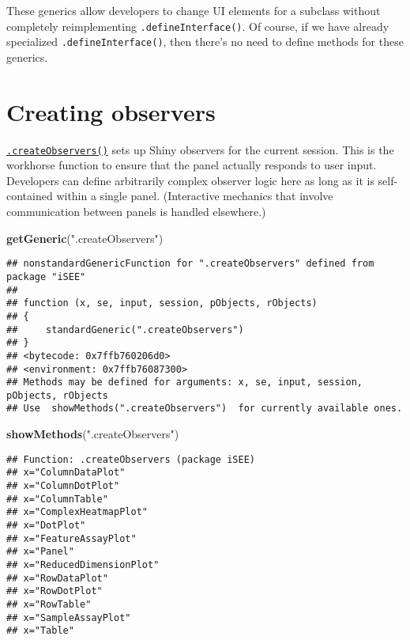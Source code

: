 \documentclass[
]{book}
\newenvironment{Shaded}{\begin{snugshade}}{\end{snugshade}}
\newcommand{\KeywordTok}[1]{\textcolor[rgb]{0.13,0.29,0.53}{\textbf{#1}}}
\newcommand{\NormalTok}[1]{#1}
\newcommand{\StringTok}[1]{\textcolor[rgb]{0.31,0.60,0.02}{#1}}
\begin{document}
These generics allow developers to change UI elements for a subclass without completely reimplementing \texttt{.defineInterface()}.
Of course, if we have already specialized \texttt{.defineInterface()}, then there's no need to define methods for these generics.

\hypertarget{creating-observers}{%
\section{Creating observers}\label{creating-observers}}

\href{https://isee.github.io/iSEE/reference/observer-generics.html}{\texttt{.createObservers()}} sets up Shiny observers for the current session.
This is the workhorse function to ensure that the panel actually responds to user input.
Developers can define arbitrarily complex observer logic here as long as it is self-contained within a single panel.
(Interactive mechanics that involve communication between panels is handled elsewhere.)

\begin{Shaded}
\begin{Highlighting}[]
\KeywordTok{getGeneric}\NormalTok{(}\StringTok{".createObservers"}\NormalTok{)}
\end{Highlighting}
\end{Shaded}

\begin{verbatim}
## nonstandardGenericFunction for ".createObservers" defined from package "iSEE"
## 
## function (x, se, input, session, pObjects, rObjects) 
## {
##     standardGeneric(".createObservers")
## }
## <bytecode: 0x7ffb760206d0>
## <environment: 0x7ffb76087300>
## Methods may be defined for arguments: x, se, input, session, pObjects, rObjects
## Use  showMethods(".createObservers")  for currently available ones.
\end{verbatim}

\begin{Shaded}
\begin{Highlighting}[]
\KeywordTok{showMethods}\NormalTok{(}\StringTok{".createObservers"}\NormalTok{)}
\end{Highlighting}
\end{Shaded}

\begin{verbatim}
## Function: .createObservers (package iSEE)
## x="ColumnDataPlot"
## x="ColumnDotPlot"
## x="ColumnTable"
## x="ComplexHeatmapPlot"
## x="DotPlot"
## x="FeatureAssayPlot"
## x="Panel"
## x="ReducedDimensionPlot"
## x="RowDataPlot"
## x="RowDotPlot"
## x="RowTable"
## x="SampleAssayPlot"
## x="Table"
\end{verbatim}
\end{document}
